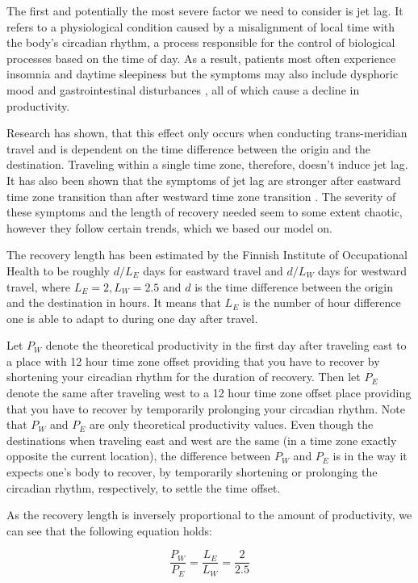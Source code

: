 
The first and potentially the most severe factor we need to consider is jet lag. It refers to a physiological condition caused by a misalignment of local time with the body's circadian rhythm, a process responsible for the control of biological processes based on the time of day. As a result, patients most often experience insomnia and daytime sleepiness but the symptoms may also include dysphoric mood and gastrointestinal disturbances \cite{Sack2010}, all of which cause a decline in productivity.

Research \cite{Cho} has shown, that this effect only occurs when conducting trans-meridian travel and is dependent on the time difference between the origin and the destination. Traveling within a single time
zone, therefore, doesn't induce jet lag. It has also been shown that the symptoms of jet lag are stronger after eastward time zone transition than after westward time zone transition \cite{Lemmer2002}. The severity of these symptoms and the length of recovery needed seem to some extent chaotic, however they follow certain trends, which we based our model on. 

The recovery length has been estimated by the Finnish Institute of Occupational Health to be roughly $d/L_E$ days for eastward travel and $d/L_W$ days for westward travel, where $L_E = 2, L_W = 2.5$ and $d$ is the time difference between the origin and the destination in hours. It means that $L_E$ is the number of hour difference one is able to adapt to during one day after travel.

Let $P_W$ denote the theoretical productivity in the first day after traveling east to a place with 12 hour time zone offset providing that you have to recover by shortening your circadian rhythm for the duration of recovery. Then let $P_E$ denote the same after traveling west to a 12 hour time zone offset place providing that you have to recover by temporarily prolonging your circadian rhythm. Note that $P_W$ and $P_E$ are only theoretical productivity values. Even though the destinations when traveling east and west are the same (in a time zone exactly opposite the current location), the difference between $P_W$ and $P_E$ is in the way it expects one's body to recover, by temporarily shortening or prolonging the circadian rhythm, respectively, to settle the time offset.

As the recovery length is inversely proportional to the amount of productivity, we can see that the following equation holds:

$$\frac{P_W}{P_E} = \frac{L_E}{L_W} = \frac{2}{2.5}$$

